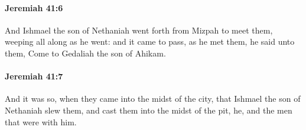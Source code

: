 		\paragraph{Jeremiah 41:6} %
			\label{JEREMIAH-41-6}

			And Ishmael the son of Nethaniah went forth from Mizpah to meet them, weeping all along as he went: and it came to pass, as he met them, he said unto them, Come to Gedaliah the son of Ahikam.


		\paragraph{Jeremiah 41:7} %
			\label{JEREMIAH-41-7}

			And it was so, when they came into the midst of the city, that Ishmael the son of Nethaniah slew them, and cast them into the midst of the pit, he, and the men that were with him.

